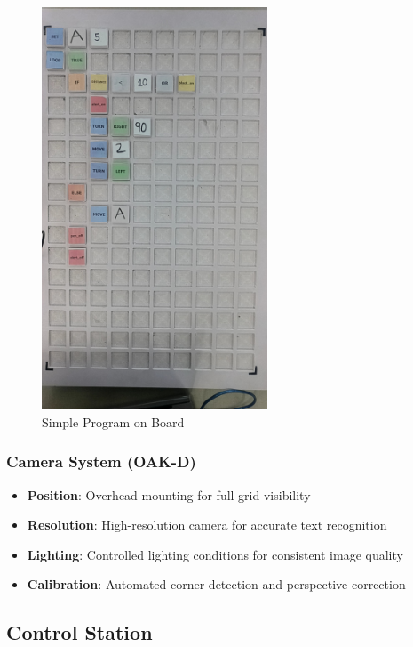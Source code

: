 \begin{figure}[H]
    \centering
    \includegraphics[width=0.6\textwidth]{assets/board.jpg}
    \caption{Simple Program on Board}
    \label{fig:programming grid}
\end{figure}

\subsubsection{Camera System (OAK-D)}
\begin{itemize}
    \item \textbf{Position}: Overhead mounting for full grid visibility
    \item \textbf{Resolution}: High-resolution camera for accurate text recognition
    \item \textbf{Lighting}: Controlled lighting conditions for consistent image quality
    \item \textbf{Calibration}: Automated corner detection and perspective correction
\end{itemize}

\subsection{Control Station}

